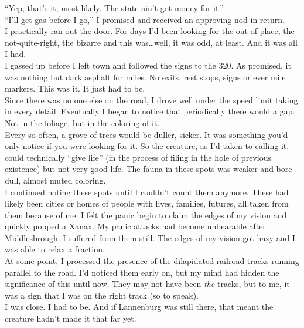 \documentclass[a5paper]{scrartcl}
\begin{document}
\enquote{Yep, that's it, most likely. The state ain't got money for it.}\\


\enquote{I'll get gas before I go,} I promised and received an approving nod in return.\\


I practically ran out the door. For days I'd been looking for the out-of-place, the not-quite-right, the bizarre and this was\dots well, it was odd, at least. And it was all I had.\\


I gassed up before I left town and followed the signs to the 320. As promised, it was nothing but dark asphalt for miles. No exits, rest stops, signs or ever mile markers. This was it. It just had to be.\\


Since there was no one else on the road, I drove well under the speed limit taking in every detail. Eventually I began to notice that periodically there would a gap. Not in the foliage, but in the coloring of it. \\


Every so often, a grove of trees would be duller, sicker. It was something you'd only notice if you were looking for it. So the creature, as I'd taken to calling it, could technically \enquote{give life} (in the process of filing in the hole of previous existence) but not very good life.  The fauna in these spots was  weaker and bore dull, almost muted coloring.\\


I continued noting these spots until I couldn't count them anymore. These had likely been cities or homes of people with lives, families, futures, all taken from them because of me. I felt the panic begin to claim the edges of my vision and quickly popped a Xanax. My panic attacks had become unbearable after Middlesbrough. I suffered from them still. The edges of my vision got hazy and I was able to relax a fraction.\\


At some point, I processed the presence of the dilapidated railroad tracks running parallel to the road. I'd noticed them early on, but my mind had hidden the significance of this until now. They may not have been \textit{the}
 tracks, but to me, it was a sign that I was on the right track (so to speak).\\


I was close. I had to be. And if Lannenburg was still there, that meant the creature hadn't made it that far yet.\\
\end{document}
